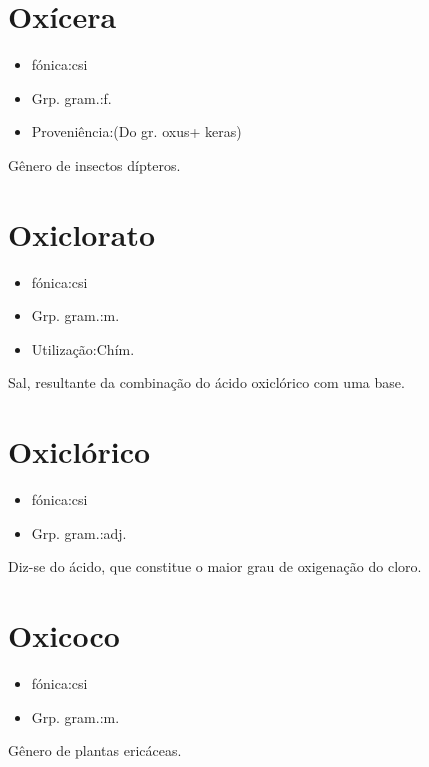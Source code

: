 \section{Oxícera}
\begin{itemize}
\item {fónica:csi}
\end{itemize}
\begin{itemize}
\item {Grp. gram.:f.}
\end{itemize}
\begin{itemize}
\item {Proveniência:(Do gr. \textunderscore oxus\textunderscore  + \textunderscore keras\textunderscore )}
\end{itemize}
Gênero de insectos dípteros.
\section{Oxiclorato}
\begin{itemize}
\item {fónica:csi}
\end{itemize}
\begin{itemize}
\item {Grp. gram.:m.}
\end{itemize}
\begin{itemize}
\item {Utilização:Chím.}
\end{itemize}
Sal, resultante da combinação do ácido oxiclórico com uma base.
\section{Oxiclórico}
\begin{itemize}
\item {fónica:csi}
\end{itemize}
\begin{itemize}
\item {Grp. gram.:adj.}
\end{itemize}
Diz-se do ácido, que constitue o maior grau de oxigenação do cloro.
\section{Oxicoco}
\begin{itemize}
\item {fónica:csi}
\end{itemize}
\begin{itemize}
\item {Grp. gram.:m.}
\end{itemize}
Gênero de plantas ericáceas.

